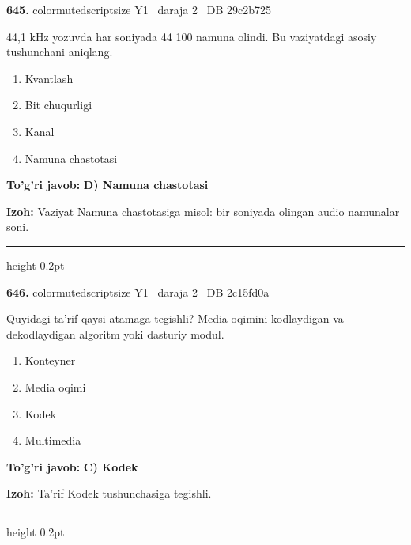 \documentclass[10pt,a4paper,oneside]{article}
\begin{document}
\noindent\textbf{\color{ink}645.}  {color{muted}scriptsize Y1 \textbullet\ daraja 2 \textbullet\ DB 29c2b725}
\par
44,1 kHz yozuvda har soniyada 44 100 namuna olindi. Bu vaziyatdagi asosiy tushunchani aniqlang.
\begin{enumerate}[label=\Alph*),leftmargin=9mm]
\item Kvantlash
\item Bit chuqurligi
\item Kanal
\item Namuna chastotasi
\end{enumerate}
\begin{tcolorbox}[enhanced,breakable,colback=teal!4,colframe=teal!50!black,boxrule=0.5pt,arc=1.1mm,left=3mm,right=3mm,top=1.7mm,bottom=1.7mm,before skip=2mm,after skip=2mm]
\textbf{\color{teal}To'g'ri javob:} \textbf{D) Namuna chastotasi}
\par\smallskip
\textbf{Izoh:} Vaziyat Namuna chastotasiga misol: bir soniyada olingan audio namunalar soni.
\end{tcolorbox}
\vspace{2mm}\hrule height 0.2pt \vspace{3mm}

\noindent\textbf{\color{ink}646.}  {color{muted}scriptsize Y1 \textbullet\ daraja 2 \textbullet\ DB 2c15fd0a}
\par
Quyidagi ta'rif qaysi atamaga tegishli? Media oqimini kodlaydigan va dekodlaydigan algoritm yoki dasturiy modul.
\begin{enumerate}[label=\Alph*),leftmargin=9mm]
\item Konteyner
\item Media oqimi
\item Kodek
\item Multimedia
\end{enumerate}
\begin{tcolorbox}[enhanced,breakable,colback=teal!4,colframe=teal!50!black,boxrule=0.5pt,arc=1.1mm,left=3mm,right=3mm,top=1.7mm,bottom=1.7mm,before skip=2mm,after skip=2mm]
\textbf{\color{teal}To'g'ri javob:} \textbf{C) Kodek}
\par\smallskip
\textbf{Izoh:} Ta'rif Kodek tushunchasiga tegishli.
\end{tcolorbox}
\vspace{2mm}\hrule height 0.2pt \vspace{3mm}
\end{document}
